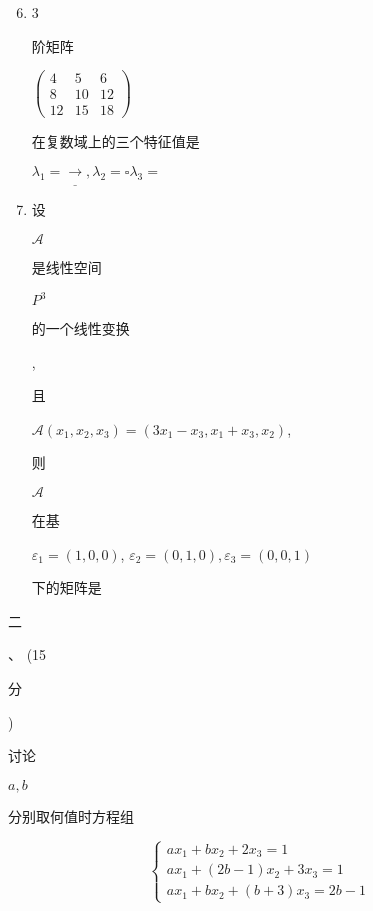 \documentclass[10pt]{article}
\begin{document}
\begin{enumerate}
  \setcounter{enumi}{5}
  \item 3 \begin{CJK}{UTF8}{mj}阶矩阵\end{CJK} $\left(\begin{array}{ccc}4 & 5 & 6 \\ 8 & 10 & 12 \\ 12 & 15 & 18\end{array}\right)$ \begin{CJK}{UTF8}{mj}在复数域上的三个特征值是\end{CJK} $\lambda_{1}=\underline{\longrightarrow}, \lambda_{2}=\square \lambda_{3}=$

  \item \begin{CJK}{UTF8}{mj}设\end{CJK} $\mathscr{A}$ \begin{CJK}{UTF8}{mj}是线性空间\end{CJK} $P^{3}$ \begin{CJK}{UTF8}{mj}的一个线性变换\end{CJK}, \begin{CJK}{UTF8}{mj}且\end{CJK} $\mathscr{A}\left(x_{1}, x_{2}, x_{3}\right)=\left(3 x_{1}-x_{3}, x_{1}+x_{3}, x_{2}\right)$, \begin{CJK}{UTF8}{mj}则\end{CJK} $\mathscr{A}$ \begin{CJK}{UTF8}{mj}在基\end{CJK} $\varepsilon_{1}=(1,0,0)$, $\varepsilon_{2}=(0,1,0), \varepsilon_{3}=(0,0,1)$ \begin{CJK}{UTF8}{mj}下的矩阵是\end{CJK}

\end{enumerate}
\begin{CJK}{UTF8}{mj}二\end{CJK}、 (15 \begin{CJK}{UTF8}{mj}分\end{CJK}) \begin{CJK}{UTF8}{mj}讨论\end{CJK} $a, b$ \begin{CJK}{UTF8}{mj}分别取何值时方程组\end{CJK}
$$
\left\{\begin{array}{l}
a x_{1}+b x_{2}+2 x_{3}=1 \\
a x_{1}+(2 b-1) x_{2}+3 x_{3}=1 \\
a x_{1}+b x_{2}+(b+3) x_{3}=2 b-1
\end{array}\right.
$$
\end{document}
